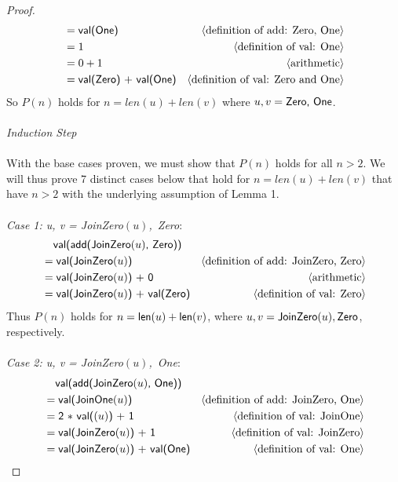 \documentclass[11pt,fleqn]{article}
\newcommand{\mname}[1]{\mbox{\sf #1}}
\newcommand{\pnote}[1]{{\langle \text{#1} \rangle}}
\begin{document}
\begin{proof}
\begin{align*}
      &= \mname{val(One)}  & \pnote{definition of add: Zero, One}\\
      &= \mname{$1$}  & \pnote{definition of val: One}\\
      &= \mname{$0 + 1$}  & \pnote{arithmetic}\\
      &= \mname{val(Zero) + val(One)}  & \pnote{definition of val: Zero and One}
    \end{align*}
    So $P(n)$ holds for $n = len(u)+len(v)$ where $u, v  = \mname{Zero, One}$.
    \\\\
    \emph{Induction Step}\\\\
    With the base cases proven, we must show that $P(n)$ holds for all $n > 2$. We will thus prove 7 distinct cases below that hold for $n = len(u) + len(v)$ that have $n > 2$ with the underlying assumption of Lemma 1.\\\\
    \emph{Case 1: u, v = \mname{JoinZero$(u)$, Zero}}:
    \begin{align*}
      &\phantom{{}=} \mname {val(add(JoinZero$(u)$, Zero))} \\
      &= \mname{val(JoinZero$(u)$)}  & \pnote{definition of add: JoinZero, Zero}\\
      &= \mname{val(JoinZero$(u)$) + 0}  & \pnote{arithmetic}\\
      &= \mname{val(JoinZero$(u)$) + val(Zero)}  & \pnote{definition of val: Zero}\\
    \end{align*}
    Thus $P(n)$ holds for $n = \mname{len}(u) + \mname{len}(v)$, where $u, v = \mname{JoinZero}(u), \mname{ Zero}$, respectively.
    \\\\
    \emph{Case 2: u, v = \mname{JoinZero$(u)$, One}}:
    \begin{align*}
      &\phantom{{}=} \mname {val(add(JoinZero$(u)$, One))} \\
      &= \mname{val(JoinOne$(u)$)}  & \pnote{definition of add: JoinZero, One}\\
      &= \mname{2 $*$ val($(u)$) + 1}  & \pnote{definition of val: JoinOne}\\
      &= \mname{val(JoinZero$(u)$) + 1}  & \pnote{definition of val: JoinZero}\\
      &= \mname{val(JoinZero$(u)$) + val(One)}  & \pnote{definition of val: One}\\
    \end{align*}

\end{proof}
\end{document}

